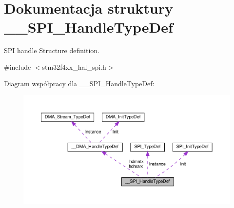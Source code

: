 \hypertarget{struct_____s_p_i___handle_type_def}{}\section{Dokumentacja struktury \+\_\+\+\_\+\+S\+P\+I\+\_\+\+Handle\+Type\+Def}
\label{struct_____s_p_i___handle_type_def}


S\+PI handle Structure definition.  




{\ttfamily \#include $<$stm32f4xx\+\_\+hal\+\_\+spi.\+h$>$}



Diagram współpracy dla \+\_\+\+\_\+\+S\+P\+I\+\_\+\+Handle\+Type\+Def\+:\nopagebreak
\begin{figure}[H]
\begin{center}
\leavevmode
\includegraphics[width=350pt]{struct_____s_p_i___handle_type_def__coll__graph}
\end{center}
\end{figure}
